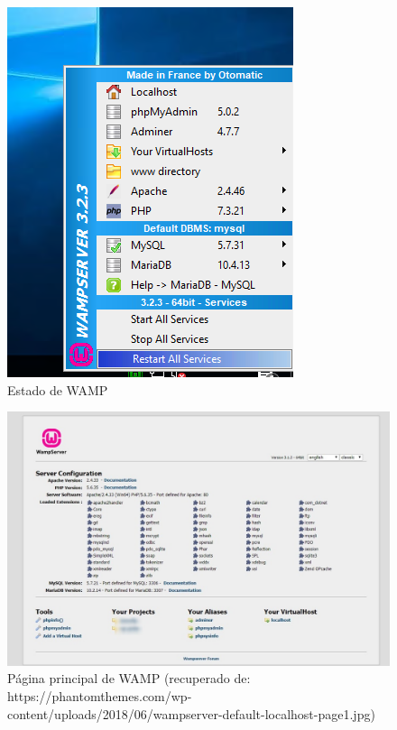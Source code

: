 \begin{figure}
	\centering
	\includegraphics[width=\linewidth]{img/wamp}
	\caption{Estado de WAMP}
	\label{fig:wamp}
\end{figure}

\begin{figure}
	\centering
	\includegraphics[width=\linewidth]{img/wampinit}
	\caption[Página principal de WAMP]{Página principal de WAMP (recuperado de: https://phantomthemes.com/wp-content/uploads/2018/06/wampserver-default-localhost-page1.jpg)}
	\label{fig:wampinit}
\end{figure}


